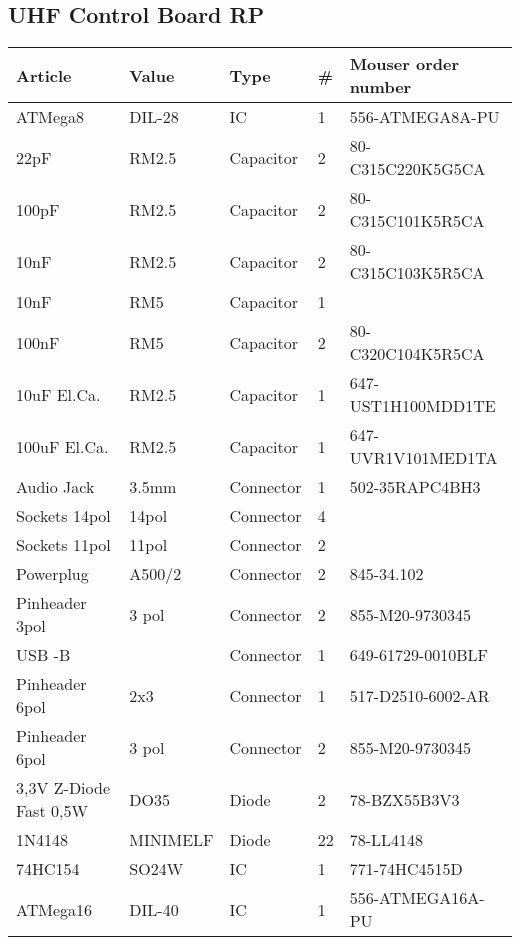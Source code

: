 \documentclass[12pt, a4paper]{report}
\begin{document}

\subsection{UHF Control Board RP}
\begin{longtable}{ *{5}{| l } | }
\hline
\textbf{Article} & \textbf{Value} & \textbf{Type} & \textbf{\#} & \textbf{Mouser order number} \\
\hline
\endhead
ATMega8 & DIL-28 & IC & 1 & 556-ATMEGA8A-PU \\
22pF & RM2.5 & Capacitor & 2 & 80-C315C220K5G5CA \\
100pF & RM2.5 & Capacitor & 2 & 80-C315C101K5R5CA \\
10nF & RM2.5 & Capacitor & 2 & 80-C315C103K5R5CA \\
10nF & RM5 & Capacitor & 1 &  \\
100nF & RM5 & Capacitor & 2 & 80-C320C104K5R5CA \\
10uF El.Ca. & RM2.5 & Capacitor & 1 & 647-UST1H100MDD1TE \\
100uF El.Ca. & RM2.5 & Capacitor & 1 & 647-UVR1V101MED1TA \\
Audio Jack  & 3.5mm & Connector & 1 & 502-35RAPC4BH3 \\
Sockets 14pol & 14pol & Connector & 4 &  \\
Sockets 11pol & 11pol & Connector & 2 &  \\
Powerplug & A500/2 & Connector & 2 & 845-34.102 \\
Pinheader 3pol & 3 pol & Connector & 2 & 855-M20-9730345 \\
USB -B &  & Connector & 1 & 649-61729-0010BLF \\
Pinheader 6pol & 2x3 & Connector & 1 & 517-D2510-6002-AR \\
Pinheader 6pol & 3 pol & Connector & 2 & 855-M20-9730345 \\
3,3V Z-Diode Fast 0,5W & DO35 & Diode & 2 & 78-BZX55B3V3 \\
1N4148 & MINIMELF & Diode & 22 & 78-LL4148 \\
74HC154 & SO24W & IC & 1 & 771-74HC4515D \\
ATMega16 & DIL-40 & IC & 1 & 556-ATMEGA16A-PU \\

\end{longtable}
\end{document}
